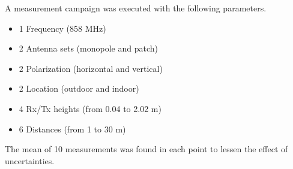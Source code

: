 \large
A measurement campaign was executed with the following parameters.
\begin{itemize}%
\item 1 Frequency (858 MHz)
\item 2 Antenna sets (monopole and patch)
\item 2 Polarization (horizontal and vertical)
\item 2 Location (outdoor and indoor)
\item 4 Rx/Tx heights (from 0.04 to 2.02 m)
\item 6 Distances (from 1 to 30 m)
\end{itemize}
The mean of 10 measurements was found in each point to lessen the effect of uncertainties. %
